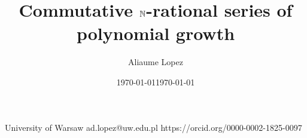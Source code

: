 \date{\today}

\title{Commutative $\mathbb{N}$-rational series of polynomial growth}

\author{Aliaume Lopez}%
       {University of Warsaw}%
       {ad.lopez@uw.edu.pl}%
       {https://orcid.org/0000-0002-1825-0097}%
       {}


\date{\today}


\category{} %
\relatedversion{} %



\newcommand{\acknowledge}{
}

\newcommand{\makeabstract}{
    \begin{abstract}
This paper studies which functions computed by $\Rel$-weighted automata can be
realised by $\Nat$-weighted automata, under two extra assumptions:
commutativity (the order of letters in the input does not matter) and
polynomial growth (the output of the function is bounded by a polynomial in the
size of the input). We
leverage this effective characterization to decide whether a function computed
by a commutative $\Nat$-weighted automaton of polynomial growth is star-free, a
notion borrowed from the theory of regular languages that has been the subject
of many investigations in the context of string-to-string functions
during the last decade. 
    \end{abstract}
}

\EventLogo{}
